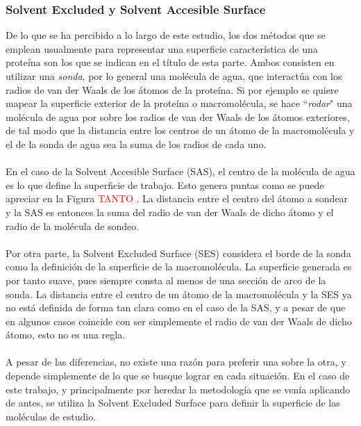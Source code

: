 \documentclass[12pt, notitlepage]{article}
\numberwithin{equation}{section}
\begin{document}
\subsubsection{Solvent Excluded y Solvent Accesible Surface}
De lo que se ha percibido a lo largo de este estudio, los dos métodos que se emplean usualmente para representar una superficie característica de una proteína son los que se indican en el título de esta parte. Ambos consisten en utilizar una \textit{sonda}, por lo general una molécula de agua, que interactúa con los radios de van der Waals de los átomos de la proteína. Si por ejemplo se quiere mapear la superficie exterior de la proteína o macromolécula, se hace ``\textit{rodar}" una molécula de agua por sobre los radios de van der Waals de los átomos exteriores, de tal modo que la distancia entre los centros de un átomo de la macromolécula y el de la sonda de agua sea la suma de los radios de cada uno.\\\\
En el caso de la Solvent Accesible Surface (SAS), el centro de la molécula de agua es lo que define la superficie de trabajo. Esto genera puntas como se puede apreciar en la Figura \textcolor{red}{TANTO} . La distancia entre el centro del átomo a sondear y la SAS es entonces la suma del radio de van der Waals de dicho átomo y el radio de la molécula de sondeo.\\\\
Por otra parte, la Solvent Excluded Surface (SES) considera el borde de la sonda como la definición de la superficie de la macromolécula. La superficie generada es por tanto suave, pues siempre consta al menos de una sección de arco de la sonda. La distancia entre el centro de un átomo de la macromolécula y la SES ya no está definida de forma tan clara como en el caso de la SAS, y a pesar de que en algunos casos coincide con ser simplemente el radio de van der Waals de dicho átomo, esto no es una regla.\\\\
A pesar de las diferencias, no existe una razón para preferir una sobre la otra, y depende simplemente de lo que se busque lograr en cada situación. En el caso de este trabajo, y principalmente por heredar la metodología que se venía aplicando de antes, se utiliza la Solvent Excluded Surface para definir la superficie de las moléculas de estudio.
\end{document}
